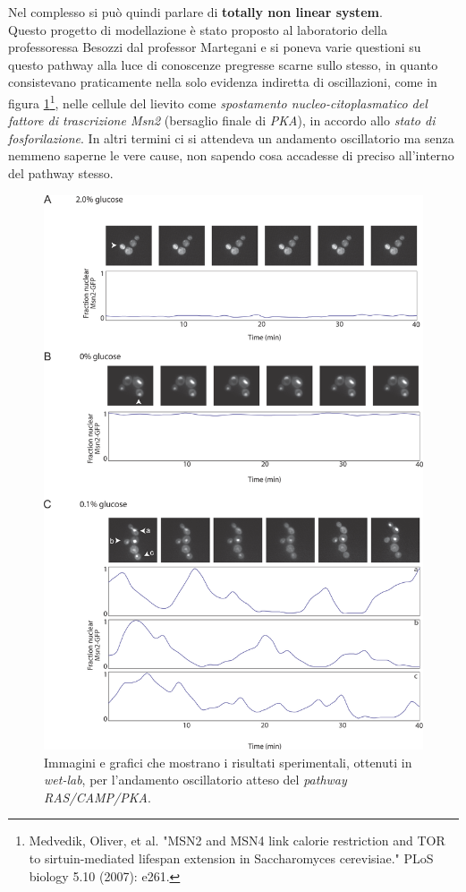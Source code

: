 \documentclass[a4paper,12pt, oneside]{book}
\begin{document}
Nel complesso si può quindi parlare di \textbf{totally non linear system}.\\
Questo progetto di modellazione è stato proposto al laboratorio della
professoressa Besozzi dal professor Martegani e si poneva varie questioni su
questo pathway alla luce di conoscenze pregresse scarne sullo stesso, in quanto
consistevano praticamente nella solo evidenza indiretta di oscillazioni, come in
figura \ref{fig:wetgluco}\footnote{Medvedik, Oliver, et al. "MSN2 and MSN4 link
  calorie restriction and TOR to sirtuin-mediated lifespan extension in
  Saccharomyces cerevisiae." PLoS biology 5.10 (2007): e261.}, nelle 
cellule del lievito come \textit{spostamento nucleo-citoplasmatico del
  fattore di trascrizione Msn2}
(bersaglio finale di \textit{PKA}), in accordo allo \textit{stato di
  fosforilazione}. In altri termini ci si attendeva un andamento oscillatorio ma
senza nemmeno saperne le vere cause, non sapendo cosa accadesse di preciso
all'interno del pathway stesso.
\begin{figure}
  \centering
  \includegraphics[scale = 2.5]{img/glucowet.png}
  \caption{Immagini e grafici che mostrano i risultati sperimentali, ottenuti in
  \textit{wet-lab}, per l'andamento oscillatorio atteso del \textit{pathway
    RAS/CAMP/PKA}.} 
\label{fig:wetgluco}
\end{figure}
\end{document}
